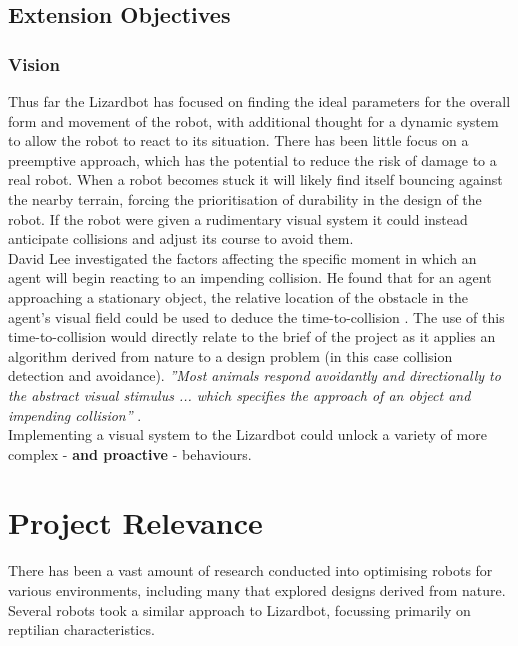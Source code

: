 \documentclass{article}
\begin{document}
\subsection{Extension Objectives}
\label{sec:Extension Objectives}
\subsubsection{Vision}
\label{sec:Vision}
Thus far the Lizardbot has focused on finding the ideal parameters for the overall form and movement of the robot, with additional thought for a dynamic system to allow the robot to react to its situation. There has been little focus on a preemptive approach, which has the potential to reduce the risk of damage to a real robot. When a robot becomes stuck it will likely find itself bouncing against the nearby terrain, forcing the prioritisation of durability in the design of the robot. If the robot were given a rudimentary visual system it could instead anticipate collisions and adjust its course to avoid them.\\ David Lee investigated the factors affecting the specific moment in which an agent will begin reacting to an impending collision. He found that for an agent approaching a stationary object, the relative location of the obstacle in the agent’s visual field could be used to deduce the time-to-collision . The use of this time-to-collision would directly relate to the brief of the project as it applies an algorithm derived from nature to a design problem (in this case collision detection and avoidance). \textit{”Most animals respond avoidantly and directionally to the abstract visual stimulus ... which specifies the approach of an object and impending collision”} .\\
Implementing a visual system to the Lizardbot could unlock a variety of more complex - \textbf{and proactive} - behaviours.

\newpage
\section{Project Relevance}
\label{sec:Project Relevance}
There has been a vast amount of research conducted into optimising robots for various environments, including many that explored designs derived from nature. Several robots took a similar approach to Lizardbot, focussing primarily on reptilian characteristics.
\end{document}
